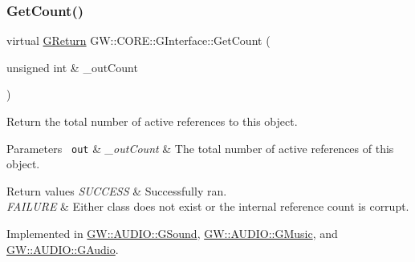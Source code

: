 \mbox{\label{classGW_1_1CORE_1_1GInterface_aacf5834174a7024f8a3c361122ee9e76}} 
\subsubsection{\texorpdfstring{GetCount()}{GetCount()}}
{\footnotesize\ttfamily virtual \mbox{\hyperlink{namespaceGW_a67a839e3df7ea8a5c5686613a7a3de21}{G\+Return}} G\+W\+::\+C\+O\+R\+E\+::\+G\+Interface\+::\+Get\+Count (\begin{DoxyParamCaption}\item[{unsigned int \&}]{\+\_\+out\+Count }\end{DoxyParamCaption})\hspace{0.3cm}{\ttfamily [pure virtual]}}



Return the total number of active references to this object. 


\begin{DoxyParams}[1]{Parameters}
\mbox{\texttt{ out}}  & {\em \+\_\+out\+Count} & The total number of active references of this object.\\
\hline
\end{DoxyParams}

\begin{DoxyRetVals}{Return values}
{\em S\+U\+C\+C\+E\+SS} & Successfully ran. \\
\hline
{\em F\+A\+I\+L\+U\+RE} & Either class does not exist or the internal reference count is corrupt. \\
\hline
\end{DoxyRetVals}


Implemented in \mbox{\hyperlink{classGW_1_1AUDIO_1_1GSound_afbac022010da2fc1a917ece2803a36a4}{G\+W\+::\+A\+U\+D\+I\+O\+::\+G\+Sound}}, \mbox{\hyperlink{classGW_1_1AUDIO_1_1GMusic_ae41f54531b8325848215596fb2f821ac}{G\+W\+::\+A\+U\+D\+I\+O\+::\+G\+Music}}, and \mbox{\hyperlink{classGW_1_1AUDIO_1_1GAudio_a079dfab7b9db1536b10c9d2afa20c89c}{G\+W\+::\+A\+U\+D\+I\+O\+::\+G\+Audio}}.

\mbox{\label{classGW_1_1CORE_1_1GInterface_a2d710f20bb78e544e8309b5b75c21260}} 
